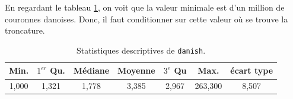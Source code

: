 		En regardant le tableau \ref{Stats_Danish}, on voit que la valeur minimale est d'un million de couronnes danoises. Donc, il faut conditionner sur cette valeur où se trouve la troncature.
		
		\begin{table}[H]
			\begin{center}
				\begin{tabular}{ccccccc}
					Min.& $1^{er}$ Qu.	&	Médiane	&	Moyenne	&	$3^e$ Qu	&	Max.	&	écart type \\
					\hline
					1,000  & 1,321 &  1,778 &  3,385 &  2,967 & 263,300  	&	8,507
				\end{tabular}
				\renewcommand{\tablename}{Tableau}
				\caption{Statistiques descriptives de \texttt{danish}.}\label{Stats_Danish}
			\end{center}
		\end{table}		
		